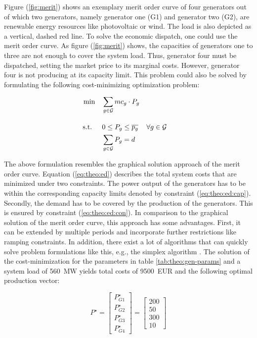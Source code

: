 Figure (\ref{fig:merit}) shows an exemplary merit order curve of four generators out of which two generators, namely generator one (G1) and generator two (G2), are renewable energy resources like photovoltaic or wind. The load is also depicted as a vertical, dashed red line. To solve the economic dispatch, one could use the merit order curve. As figure (\ref{fig:merit}) shows, the capacities of generators one to three are not enough to cover the system load. Thus, generator four must be dispatched, setting the market price to its marginal costs. However, generator four is not producing at its capacity limit. This problem could also be solved by formulating the following cost-minimizing optimization problem:

\begin{subequations}
	\begin{align}
		 \min \quad & \sum_{g\in\mathcal{G}}mc_g \cdot P_{g} \label{eq:theo:ed} \\[10pt]
		 \text{s.t. } \quad & 0 \leq P_{g} \leq \overline{p_g} && \forall g \in \mathcal{G} \label{eq:theo:ed:cap} \\
		 & \sum_{g \in \mathcal{G}} P_{g} = d \label{eq:theo:ed:con}
	\end{align}
\end{subequations}

The above formulation resembles the graphical solution approach of the merit order curve. Equation (\ref{eq:theo:ed}) describes the total system costs that are minimized under two constraints. The power output of the generators has to be within the corresponding capacity limits denoted by constraint (\ref{eq:theo:ed:cap}). Secondly, the demand has to be covered by the production of the generators. This is ensured by constraint (\ref{eq:theo:ed:con}). In comparison to the graphical solution of the merit order curve, this approach has some advantages. First, it can be extended by multiple periods and incorporate further restrictions like ramping constraints. In addition, there exist a lot of algorithms that can quickly solve problem formulations like this, e.g., the simplex algorithm \citep{dantzig1963}. The solution of the cost-minimization for the parameters in table \ref{tab:theo:gen-params} and a system load of \SI{560}{\mega\watt} yields total costs of \SI{9500}{EUR} and the following optimal production vector:

\begin{equation}
	P^{\star} = \begin{bmatrix}
		P_{G1}^{\star} \\
		P_{G2}^{\star} \\
		P_{G3}^{\star} \\
		P_{G4}^{\star}
	\end{bmatrix} = \begin{bmatrix}
		200 \\
		50 \\
		300 \\
		10
	\end{bmatrix}
\end{equation}


